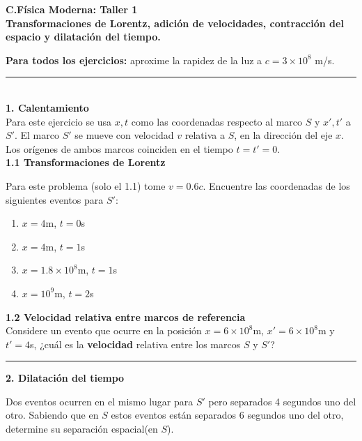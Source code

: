 \documentclass[12pt]{article}
\begin{document}
 
\begin{center}
\Large \textbf{C.Física Moderna: Taller 1}\\
\normalsize \textbf{Transformaciones de Lorentz, adición de velocidades, contracción del espacio y dilatación del tiempo. }
\end{center}
 
 
 \textbf{Para todos los ejercicios:} aproxime la rapidez de la luz a $c=3\times 10^8$ m/s.\\ 
\noindent\rule{16.5cm}{0.4pt}\\ 
 \textbf{1. Calentamiento}\\
 
  Para este ejercicio se usa $x,t$ como las coordenadas respecto al marco $S$ y $x',t'$ a $S'$. El marco $S'$ se mueve con velocidad $v$ relativa a $S$, en la dirección del eje $x$. Los orígenes de ambos marcos coinciden en el tiempo $t = t' = 0$.\\
 
 \textbf{1.1 Transformaciones de Lorentz}
 
 Para este problema (solo el 1.1) tome $v = 0.6c$. Encuentre las coordenadas de los siguientes eventos para $S'$:
 
 \begin{enumerate}
 	\item $x=4$m, $t = 0$s\\
 	\item $x=4$m, $t = 1$s\\
 	\item $x=1.8\times 10^8$m, $t = 1$s\\
 	\item $x=10^9$m, $t = 2$s\\
 \end{enumerate} 
 
 

\textbf{1.2 Velocidad relativa entre marcos de referencia}\\

Considere un evento que ocurre en la posición $x=6\times 10^8$m, $x'=6\times 10^8$m  y $t'=4$s, ¿cuál es la \textbf{velocidad} relativa entre los marcos $S$ y $S'$? 


\noindent\rule{16.5cm}{0.4pt}



\textbf{2. Dilatación del tiempo}

Dos eventos ocurren en el mismo lugar para $S'$ pero separados 4 segundos uno del otro. Sabiendo que en $S$ estos eventos están separados 6 segundos uno del otro, determine su separación espacial(en $S$).
\end{document}
